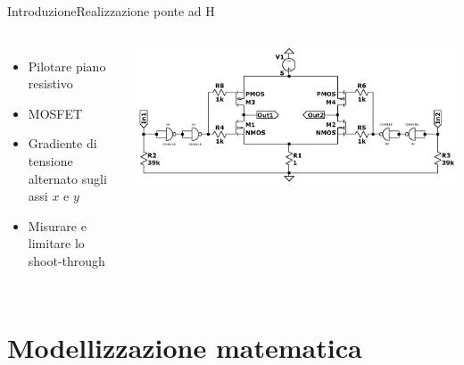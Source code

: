 \documentclass[10pt,aspectratio=169
	]{beamer}
\begin{document}
	\begin{frame}{Introduzione}{Realizzazione ponte ad H}

	\begin{columns}
	
	\begin{itemize}
		\item Pilotare piano resistivo
		\item MOSFET
		\item Gradiente di tensione alternato sugli assi $x$ e $y$
		\item Misurare e limitare lo shoot-through
	\end{itemize}
	\centering
	\includegraphics[width=\textwidth]{./images/circuit3.png}
	\end{columns}
	\end{frame}
	
	
	\section{Modellizzazione matematica}
\end{document}
